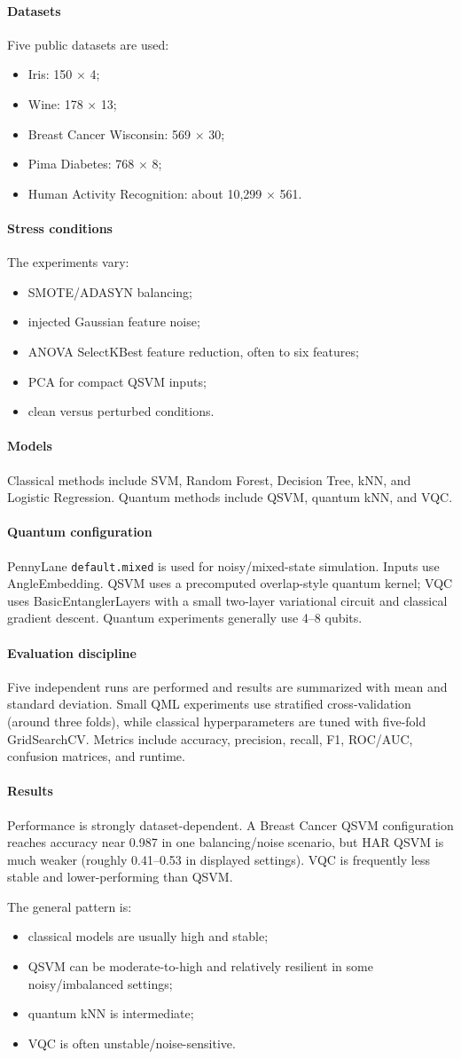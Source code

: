 \documentclass[11pt]{article}
\newcommand{\reviewfield}[2]{\paragraph{#1}#2}
\begin{document}
\reviewfield{Datasets}{
Five public datasets are used:
\begin{itemize}
    \item Iris: 150 $\times$ 4;
    \item Wine: 178 $\times$ 13;
    \item Breast Cancer Wisconsin: 569 $\times$ 30;
    \item Pima Diabetes: 768 $\times$ 8;
    \item Human Activity Recognition: about 10,299 $\times$ 561.
\end{itemize}
}

\reviewfield{Stress conditions}{
The experiments vary:
\begin{itemize}
    \item SMOTE/ADASYN balancing;
    \item injected Gaussian feature noise;
    \item ANOVA SelectKBest feature reduction, often to six features;
    \item PCA for compact QSVM inputs;
    \item clean versus perturbed conditions.
\end{itemize}
}

\reviewfield{Models}{
Classical methods include SVM, Random Forest, Decision Tree, kNN, and Logistic Regression. Quantum methods include QSVM, quantum kNN, and VQC.
}

\reviewfield{Quantum configuration}{
PennyLane \texttt{default.mixed} is used for noisy/mixed-state simulation. Inputs use AngleEmbedding. QSVM uses a precomputed overlap-style quantum kernel; VQC uses BasicEntanglerLayers with a small two-layer variational circuit and classical gradient descent. Quantum experiments generally use 4--8 qubits.
}

\reviewfield{Evaluation discipline}{
Five independent runs are performed and results are summarized with mean and standard deviation. Small QML experiments use stratified cross-validation (around three folds), while classical hyperparameters are tuned with five-fold GridSearchCV. Metrics include accuracy, precision, recall, F1, ROC/AUC, confusion matrices, and runtime.
}

\reviewfield{Results}{
Performance is strongly dataset-dependent. A Breast Cancer QSVM configuration reaches accuracy near 0.987 in one balancing/noise scenario, but HAR QSVM is much weaker (roughly 0.41--0.53 in displayed settings). VQC is frequently less stable and lower-performing than QSVM.

The general pattern is:
\begin{itemize}
    \item classical models are usually high and stable;
    \item QSVM can be moderate-to-high and relatively resilient in some noisy/imbalanced settings;
    \item quantum kNN is intermediate;
    \item VQC is often unstable/noise-sensitive.
\end{itemize}
}
\end{document}
